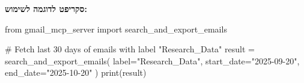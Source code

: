 
\textbf{סקריפט לדוגמה לשימוש:}

\begin{pythonbox}
from gmail_mcp_server import search_and_export_emails

# Fetch last 30 days of emails with label "Research_Data"
result = search_and_export_emails(
    label="Research_Data",
    start_date="2025-09-20",
    end_date="2025-10-20"
)
print(result)
\end{pythonbox}
